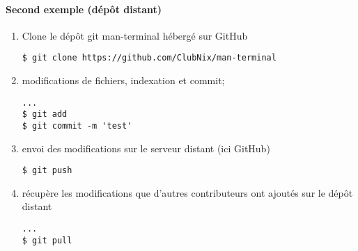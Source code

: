 \paragraph{Second exemple (dépôt distant)}
\begin{enumerate}
\item Clone le dépôt git man-terminal hébergé sur GitHub
\begin{lstlisting}
$ git clone https://github.com/ClubNix/man-terminal
\end{lstlisting}
\item modifications de fichiers, indexation et commit;
\begin{lstlisting}
...
$ git add 
$ git commit -m 'test'
\end{lstlisting}
\item envoi des modifications sur le serveur distant (ici GitHub)
\begin{lstlisting}
$ git push
\end{lstlisting}

\item récupère les modifications que d'autres contributeurs ont ajoutés sur le dépôt distant
\begin{lstlisting}
...
$ git pull
\end{lstlisting}
\end{enumerate}

